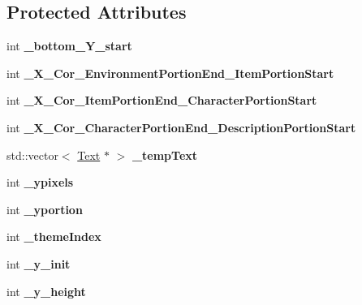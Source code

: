 \subsection*{Protected Attributes}
\begin{DoxyCompactItemize}
\item 
\hypertarget{class_level_editor_a8aab4280653e6d98ca5d6568a36a721e}{}\label{class_level_editor_a8aab4280653e6d98ca5d6568a36a721e} 
int {\bfseries \+\_\+bottom\+\_\+\+Y\+\_\+start}
\item 
\hypertarget{class_level_editor_aabeca8d16c0683c750ac3fad06849db0}{}\label{class_level_editor_aabeca8d16c0683c750ac3fad06849db0} 
int {\bfseries \+\_\+\+X\+\_\+\+Cor\+\_\+\+Environment\+Portion\+End\+\_\+\+Item\+Portion\+Start}
\item 
\hypertarget{class_level_editor_a1035584575c5f75689e677de113c5a2d}{}\label{class_level_editor_a1035584575c5f75689e677de113c5a2d} 
int {\bfseries \+\_\+\+X\+\_\+\+Cor\+\_\+\+Item\+Portion\+End\+\_\+\+Character\+Portion\+Start}
\item 
\hypertarget{class_level_editor_a5d3b9f71b13a0f5125b30edf3831e373}{}\label{class_level_editor_a5d3b9f71b13a0f5125b30edf3831e373} 
int {\bfseries \+\_\+\+X\+\_\+\+Cor\+\_\+\+Character\+Portion\+End\+\_\+\+Description\+Portion\+Start}
\item 
\hypertarget{class_level_editor_af1e8b79e761ba962dcb310ab3c0d400e}{}\label{class_level_editor_af1e8b79e761ba962dcb310ab3c0d400e} 
std\+::vector$<$ \hyperlink{class_text}{Text} $\ast$ $>$ {\bfseries \+\_\+temp\+Text}
\item 
\hypertarget{class_level_editor_aafa138f9c4ffc3d9ac0fb51a882178c6}{}\label{class_level_editor_aafa138f9c4ffc3d9ac0fb51a882178c6} 
int {\bfseries \+\_\+ypixels}
\item 
\hypertarget{class_level_editor_ac2357133222a0175792c142e61b8cef9}{}\label{class_level_editor_ac2357133222a0175792c142e61b8cef9} 
int {\bfseries \+\_\+yportion}
\item 
\hypertarget{class_level_editor_aa4620a93b612f7546564ed69ba243b1f}{}\label{class_level_editor_aa4620a93b612f7546564ed69ba243b1f} 
int {\bfseries \+\_\+theme\+Index}
\item 
\hypertarget{class_level_editor_a61119af877e5381f153a06c0cf8dd838}{}\label{class_level_editor_a61119af877e5381f153a06c0cf8dd838} 
int {\bfseries \+\_\+y\+\_\+init}
\item 
\hypertarget{class_level_editor_a2aa343c80f14b6b2b0aaa2f9368a19e0}{}\label{class_level_editor_a2aa343c80f14b6b2b0aaa2f9368a19e0} 
int {\bfseries \+\_\+y\+\_\+height}

\end{DoxyCompactItemize}
